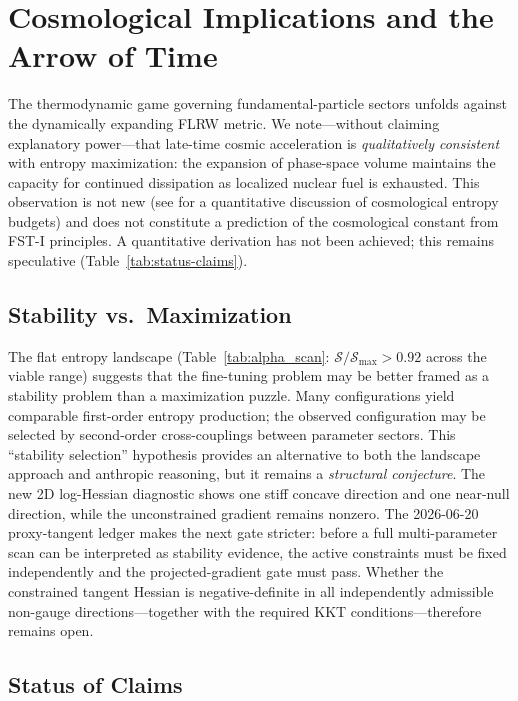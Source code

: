 \documentclass[12pt,a4paper]{article}
\theoremstyle{remark}
\begin{document}
\section{Cosmological Implications and the Arrow of Time}
\label{sec:cosmology}

The thermodynamic game governing fundamental-particle sectors unfolds against the dynamically expanding FLRW metric. We note---without claiming explanatory power---that late-time cosmic acceleration is \emph{qualitatively consistent} with entropy maximization: the expansion of phase-space volume maintains the capacity for continued dissipation as localized nuclear fuel is exhausted. This observation is not new (see \citep{EntropyMaximum} for a quantitative discussion of cosmological entropy budgets) and does not constitute a prediction of the cosmological constant from FST-I principles. A quantitative derivation has not been achieved; this remains speculative (Table~\ref{tab:status-claims}).

\subsection{Stability vs.\ Maximization}

The flat entropy landscape (Table~\ref{tab:alpha_scan}: $\mathcal{S}/\mathcal{S}_{\max} > 0.92$ across the viable range) suggests that the fine-tuning problem may be better framed as a stability problem than a maximization puzzle. Many configurations yield comparable first-order entropy production; the observed configuration may be selected by second-order cross-couplings between parameter sectors. This ``stability selection'' hypothesis provides an alternative to both the landscape approach and anthropic reasoning, but it remains a \emph{structural conjecture}. The new 2D log-Hessian diagnostic shows one stiff concave direction and one near-null direction, while the unconstrained gradient remains nonzero. The 2026-06-20 proxy-tangent ledger makes the next gate stricter: before a full multi-parameter scan can be interpreted as stability evidence, the active constraints must be fixed independently and the projected-gradient gate must pass. Whether the constrained tangent Hessian is negative-definite in all independently admissible non-gauge directions---together with the required KKT conditions---therefore remains open.

\subsection{Status of Claims}
\end{document}
